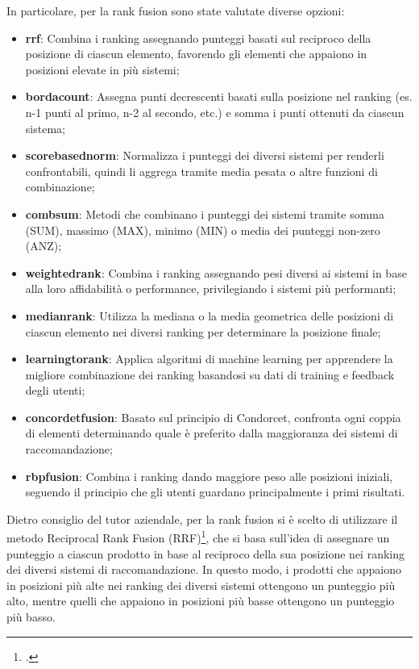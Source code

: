 In particolare, per la rank fusion sono state valutate diverse opzioni:
\begin{itemize}
    \item \textbf{\gls{rrf}}: Combina i ranking assegnando punteggi basati sul reciproco della posizione di ciascun elemento, favorendo gli elementi che appaiono in posizioni elevate in più sistemi;
    \item \textbf{\gls{bordacount}}: Assegna punti decrescenti basati sulla posizione nel ranking (es. n-1 punti al primo, n-2 al secondo, etc.) e somma i punti ottenuti da ciascun sistema;
    \item \textbf{\gls{scorebasednorm}}: Normalizza i punteggi dei diversi sistemi per renderli confrontabili, quindi li aggrega tramite media pesata o altre funzioni di combinazione;
    \item \textbf{\gls{combsum}}: Metodi che combinano i punteggi dei sistemi tramite somma (SUM), massimo (MAX), minimo (MIN) o media dei punteggi non-zero (ANZ);
    \item \textbf{\gls{weightedrank}}: Combina i ranking assegnando pesi diversi ai sistemi in base alla loro affidabilità o performance, privilegiando i sistemi più performanti;
    \item \textbf{\gls{medianrank}}: Utilizza la mediana o la media geometrica delle posizioni di ciascun elemento nei diversi ranking per determinare la posizione finale;
    \item \textbf{\gls{learningtorank}}: Applica algoritmi di machine learning per apprendere la migliore combinazione dei ranking basandosi su dati di training e feedback degli utenti;
    \item \textbf{\gls{concordetfusion}}: Basato sul principio di Condorcet, confronta ogni coppia di elementi determinando quale è preferito dalla maggioranza dei sistemi di raccomandazione;
    \item \textbf{\gls{rbpfusion}}: Combina i ranking dando maggiore peso alle posizioni iniziali, seguendo il principio che gli utenti guardano principalmente i primi risultati.
\end{itemize}

Dietro consiglio del tutor aziendale, per la rank fusion si è scelto di utilizzare il metodo Reciprocal Rank Fusion (RRF)\footcite{site:rrf-explained}, che si basa sull'idea di assegnare un punteggio a ciascun prodotto in base al reciproco della sua posizione nei ranking dei diversi sistemi di raccomandazione. In questo modo, i prodotti che appaiono in posizioni più alte nei ranking dei diversi sistemi ottengono un punteggio più alto, mentre quelli che appaiono in posizioni più basse ottengono un punteggio più basso.

